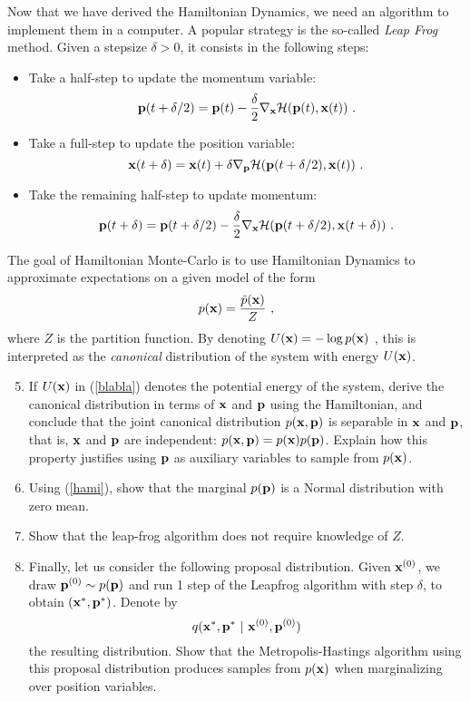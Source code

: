 \documentclass{article}
\newcommand{\xx}{{\bf x}}
\newcommand{\pp}{{\bf p}}
\begin{document}
Now that we have derived the Hamiltonian Dynamics, we need an algorithm to implement them in a computer. 
A popular strategy is the so-called \emph{Leap Frog} method. Given a stepsize $\delta > 0$, it consists in the following steps:
\begin{itemize}
\item Take a half-step to update the momentum variable: $$\pp( t + \delta/2) = \pp(t) - \frac{\delta}{2} \nabla_{\xx} \mathcal{H}(\pp(t), \xx(t))~.$$
\item Take a full-step to update the position variable: $$\xx( t + \delta) = \xx(t) + \delta \nabla_{\pp} \mathcal{H}(\pp(t+\delta/2), \xx(t))~.$$
\item Take the remaining half-step to update momentum: $$\pp( t + \delta) = \pp(t+\delta/2) - \frac{\delta}{2} \nabla_{\xx} \mathcal{H}(\pp(t+\delta/2), \xx(t+\delta))~.$$
\end{itemize}
The goal of Hamiltonian Monte-Carlo is to use Hamiltonian Dynamics to approximate expectations 
on a given model of the form 
\begin{equation}
\label{blabla}
p(\xx) = \frac{\tilde{p}(\xx)}{Z}~,
\end{equation}
 where $Z$ is the partition function. By denoting $U(\xx) = -\log p(\xx)$ , this is 
 interpreted as the \emph{canonical} distribution of the system with energy $U(\xx)$. 
\begin{enumerate}
\setcounter{enumi}{4}
\item If $U(\xx)$ in (\ref{blabla}) denotes the potential energy of the system, derive the canonical distribution in terms of $\xx$ and $\pp$ using the Hamiltonian, and conclude that the joint canonical distribution $p(\xx,\pp)$ is separable in $\xx$ and $\pp$, that is, $\xx$ and $\pp$ are independent: $p(\xx, \pp) = p(\xx) p(\pp)$. Explain how this property justifies using $\pp$ as auxiliary variables to sample from $p(\xx)$.
\item Using (\ref{hami}), show that the marginal $p(\pp)$ is a Normal distribution with zero mean.
\item Show that the leap-frog algorithm does not require knowledge of $Z$.
\item Finally, let us consider the following proposal distribution. Given $\xx^{(0)}$, we 
draw $\pp^{(0)} \sim p(\pp)$ and run 1 step of the Leapfrog algorithm with step $\delta$, to obtain
$( \xx^{*}, \pp^{*})$. Denote by   
\begin{equation}
q( \xx^*, \pp^* ~|~ \xx^{(0)}, \pp^{(0)}) 
\end{equation}
the resulting distribution. Show that the Metropolis-Hastings algorithm using this proposal distribution produces samples from $p(\xx)$ when marginalizing over position variables. 
\end{enumerate}



%
%
\end{document}
